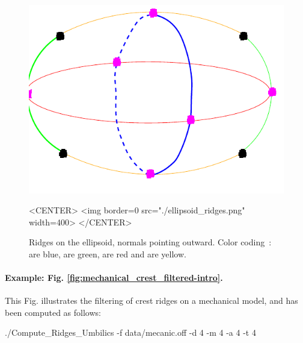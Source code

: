 \begin{figure}[!ht]
\begin{ccTexOnly}
\centerline{
\includegraphics[width=.5\linewidth]{Ridges_3/ellipsoid_ridges}}
\end{ccTexOnly}

\begin{ccHtmlOnly}
<CENTER> <img border=0 src="./ellipsoid_ridges.png" width=400>
</CENTER>
\end{ccHtmlOnly}
\caption{Ridges on the ellipsoid, normals pointing outward.
 Color coding~:  are blue,
 are green,  are red and 
 are yellow. }
\label{ellipsoid-ridges-example}
\end{figure}

\paragraph{Example:  Fig.  \ref{fig:mechanical_crest_filtered-intro}.}
This Fig. illustrates the filtering of crest ridges on a mechanical
model, and has been computed as follows:
\begin{ccExampleCode}
./Compute_Ridges_Umbilics -f data/mecanic.off -d 4 -m 4 -a 4 -t 4
\end{ccExampleCode}

